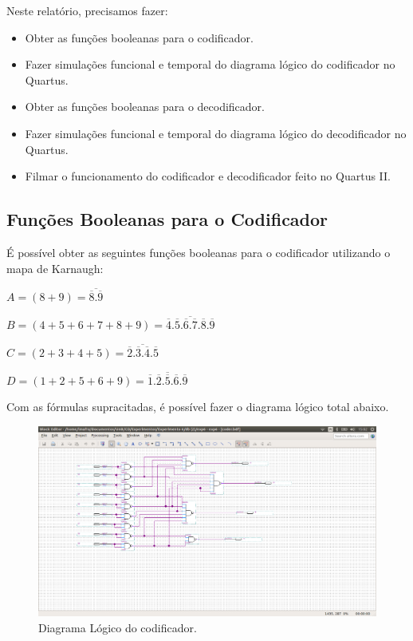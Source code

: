 \documentclass[12pt]{article}
\begin{document}
Neste relatório, precisamos fazer:
\begin{itemize}
	\item Obter as funções booleanas para o codificador.
	\item Fazer simulações funcional e temporal do diagrama lógico do codificador no Quartus. 
	\item Obter as funções booleanas para o decodificador.
	\item Fazer simulações funcional e temporal do diagrama lógico do decodificador no Quartus. 
	\item Filmar o funcionamento do codificador e decodificador feito no Quartus II.
\end{itemize}

\subsection{Funções Booleanas para o Codificador}
\label{sec:Cod}

É possível obter as seguintes funções booleanas para o codificador utilizando o mapa de Karnaugh:

$A = (8+9) = \overline{\overline{8}.\overline{9}}$

$B = (4 + 5 + 6 + 7 + 8 + 9) = \overline{\overline{4}.\overline{5}.\overline{6}.\overline{7}.\overline{8}.\overline{9}} $

$C = (2 + 3 + 4 + 5) = \overline{\overline{2}.\overline{3}.\overline{4}.\overline{5}}$

$D = (1 + 2 + 5 + 6 + 9) = \overline{\overline{1}.\overline{2}.\overline{5}.\overline{6}.\overline{9}}$

Com as fórmulas supracitadas, é possível fazer o diagrama lógico total abaixo.

\begin{figure}[H]
	\centering
	\includegraphics[width=1\textwidth]{coder.png}
	\caption{Diagrama Lógico do codificador.}
	\label{fig:coder}
\end{figure}
\end{document}
